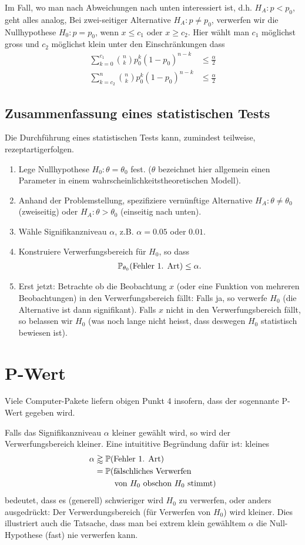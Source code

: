 Im Fall, wo man nach Abweichungen nach unten interessiert ist, d.h. $H_A: p<p_0$, geht alles analog, Bei zwei-seitiger Alternative $H_A:p\neq p_0$, verwerfen wir die Nullhypothese $H_0:p=p_0$, wenn $x\leq c_1$ oder $x\geq c_2$. Hier wählt man $c_1$ möglichst gross und $c_2$ möglichst klein unter den Einschränkungen dass
\begin{align*}
	\sum_{k=0}^{c_1}{n\choose k}p_{0}^{k}(1-p_0)^{n-k}&\leq \frac{\alpha}{2}\\
	\sum_{k=c_2}^{n}{n\choose k}p_{0}^{k}(1-p_0)^{n-k}&\leq \frac{\alpha}{2}
\end{align*}
\subsection{Zusammenfassung eines statistischen Tests}
Die Durchführung eines statistischen Tests kann, zumindest teilweise, \glqq rezeptartig\grqq erfolgen.
\begin{enumerate}[1.]
	\item Lege Nullhypothese $H_0: \theta=\theta_0$ fest. ($\theta$ bezeichnet hier allgemein einen Parameter in einem wahrscheinlichkeitstheoretischen Modell).
	\item Anhand der Problemstellung, spezifiziere vernünftige Alternative $H_A:\theta\neq \theta_0$ (zweiseitig) oder $H_A:\theta> \theta_0$ (einseitig nach unten).
	\item Wähle Signifikanzniveau $\alpha$, z.B. $\alpha=0.05$ oder $0.01$.
	\item Konstruiere Verwerfungsbereich für $H_0$, so dass 
		\begin{gather*}
			\mathbb P_{\theta_0}(\text{Fehler 1. Art})\leq \alpha.
		\end{gather*}
	\item Erst jetzt: Betrachte ob die Beobachtung $x$ (oder eine Funktion von mehreren Beobachtungen) in den Verwerfungsbereich fällt: Falls ja, so verwerfe $H_0$ (die Alternative ist dann \glqq signifikant\grqq). Falls $x$ nicht in den Verwerfungsbereich fällt, so belassen wir $H_0$ (was noch lange nicht heisst, dass deswegen $H_0$ statistisch bewiesen ist).
\end{enumerate}
\section{P-Wert}
Viele Computer-Pakete liefern obigen Punkt 4 insofern, dass der sogennante P-Wert gegeben wird.

Falls das Signifikanzniveau $\alpha$ kleiner gewählt wird, so wird der Verwerfungsbereich kleiner. Eine intuititive Begründung dafür ist: kleines
\begin{align*}
	\alpha&\gtrapprox \p(\text{Fehler 1. Art})\\
	&=\p(\text{fälschliches Verwerfen} \\
	&\hphantom{=\p()} \text{von $H_0$ obschon $H_0$ stimmt})
\end{align*}
bedeutet, dass es (generell) schwieriger wird $H_0$ zu verwerfen, oder anders ausgedrückt: Der Verwerdungsbereich (für Verwerfen von $H_0$) wird kleiner. Dies illustriert auch die Tatsache, dass man bei extrem klein gewähltem $\alpha$ die Null-Hypothese (fast) nie verwerfen kann.

